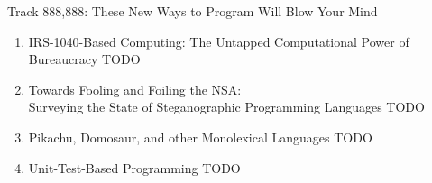 \documentclass[letter]{article}
\newcommand\track[2]{{\Large Track #1: #2}}
\newcommand\paper[2]{\item \sf #1 \dotfill TODO}
\newcommand\keywords[1]{}
\begin{document}
\vspace{4em}

\track{888,888}{These New Ways to Program Will Blow Your Mind}
\begin{enumerate}
\paper{IRS-1040-Based Computing: The Untapped Computational Power of Bureaucracy}
{William Gunther and Brian Kell}
\keywords{unconventional computation,
taxes,
compilers,
bureaucracy}
\paper{Towards Fooling and Foiling the NSA: \\
Surveying the State of Steganographic Programming Languages}
{Wolfgang Richter and Debjani Biswas}
\keywords{steganography,
esoteric programming language,
esoteric,
programming languages,
obfuscation,
cryptography,
shit}
\paper{Pikachu, Domosaur, and other Monolexical Languages}
{Sarah Allen, Jesse Dodge, and Domosaur Domosaur}
\keywords{natural language processing,
regular languages,
translation}
\paper{Unit-Test-Based Programming}
{Miguel \'{A}. Lech\'{o}n}
\keywords{unit test,
automatic stubbornness,
holy grail}
\end{enumerate}
\thispagestyle{empty}
\end{document}
